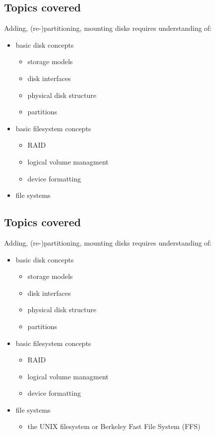 \documentclass[xga]{xdvislides}
\begin{document}
\subsection{Topics covered}
Adding, (re-)partitioning, mounting disks requires understanding of:
\begin{itemize}
	\item basic disk concepts
		\begin{itemize}
			\item storage models
			\item disk interfaces
			\item physical disk structure
			\item partitions
		\end{itemize}
	\item basic filesystem concepts
		\begin{itemize}
			\item RAID
			\item logical volume managment
			\item device formatting
		\end{itemize}
	\item file systems
\end{itemize}

\subsection{Topics covered}
Adding, (re-)partitioning, mounting disks requires understanding of:
\begin{itemize}
	\item basic disk concepts
		\begin{itemize}
			\item storage models
			\item disk interfaces
			\item physical disk structure
			\item partitions
		\end{itemize}
	\item basic filesystem concepts
		\begin{itemize}
			\item RAID
			\item logical volume managment
			\item device formatting
		\end{itemize}
	\item file systems
		\begin{itemize}
			\item the UNIX filesystem or Berkeley Fast File System (FFS)
		\end{itemize}
\end{itemize}
\end{document}

